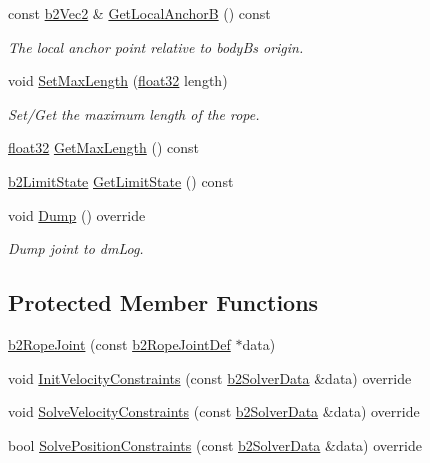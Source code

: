 \begin{DoxyCompactItemize}
const \mbox{\hyperlink{structb2_vec2}{b2\+Vec2}} \& \mbox{\hyperlink{classb2_rope_joint_a8a9b925c7ffa11d331ba369cc9fe2ac5}{Get\+Local\+AnchorB}} () const
\begin{DoxyCompactList}\small\item\em The local anchor point relative to bodyB\textquotesingle{}s origin. \end{DoxyCompactList}\item 
void \mbox{\hyperlink{classb2_rope_joint_a92cea201d21acd2f2a7cc9b00e165848}{Set\+Max\+Length}} (\mbox{\hyperlink{b2_settings_8h_aacdc525d6f7bddb3ae95d5c311bd06a1}{float32}} length)
\begin{DoxyCompactList}\small\item\em Set/\+Get the maximum length of the rope. \end{DoxyCompactList}\item 
\mbox{\hyperlink{b2_settings_8h_aacdc525d6f7bddb3ae95d5c311bd06a1}{float32}} \mbox{\hyperlink{classb2_rope_joint_abdcc1962f25103a49f6e3f4182559efa}{Get\+Max\+Length}} () const
\item 
\mbox{\hyperlink{b2_joint_8h_ae7784edce074221afeb010d638404443}{b2\+Limit\+State}} \mbox{\hyperlink{classb2_rope_joint_ab7b606273b65339f0ab502675f32997e}{Get\+Limit\+State}} () const
\item 
void \mbox{\hyperlink{classb2_rope_joint_a0028d3d3710bf1a9a905e9b55a4f37c5}{Dump}} () override
\begin{DoxyCompactList}\small\item\em Dump joint to dm\+Log. \end{DoxyCompactList}\end{DoxyCompactItemize}
\subsection*{Protected Member Functions}
\begin{DoxyCompactItemize}
\item 
\mbox{\hyperlink{classb2_rope_joint_a3f69f238616d8dc622d9448f81e14e53}{b2\+Rope\+Joint}} (const \mbox{\hyperlink{structb2_rope_joint_def}{b2\+Rope\+Joint\+Def}} $\ast$data)
\item 
void \mbox{\hyperlink{classb2_rope_joint_a8a9bd57a12aaf38b529ae626e714e1e8}{Init\+Velocity\+Constraints}} (const \mbox{\hyperlink{structb2_solver_data}{b2\+Solver\+Data}} \&data) override
\item 
void \mbox{\hyperlink{classb2_rope_joint_a08bf8f6cffe281a9f58ee469f99bf5b1}{Solve\+Velocity\+Constraints}} (const \mbox{\hyperlink{structb2_solver_data}{b2\+Solver\+Data}} \&data) override
\item 
bool \mbox{\hyperlink{classb2_rope_joint_a2fcbda6d472c660aa01793c798a8f92e}{Solve\+Position\+Constraints}} (const \mbox{\hyperlink{structb2_solver_data}{b2\+Solver\+Data}} \&data) override
\end{DoxyCompactItemize}
